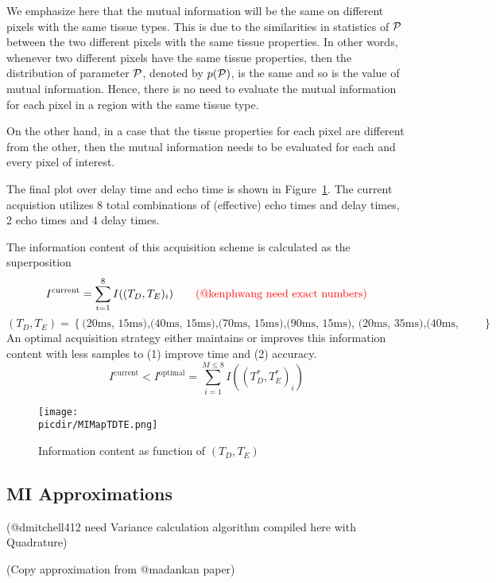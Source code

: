 \documentclass{article}         %
\theoremstyle{definition}
\theoremstyle{remark}
\newcommand{\picdir}{pdffig/}
\begin{document}
We emphasize here that the mutual information will be the same on different pixels with the same tissue types. This is due to the similarities in statistics of $\mathcal{P}$ between the two different pixels with the same tissue properties. In other words, whenever two different pixels have the same tissue properties, then the distribution of parameter $\mathcal{P}$, denoted by $p(\mathcal{P})$, is the same and so is the value of mutual information. Hence, there is no need to evaluate the mutual information for each pixel in a region with the same tissue type. 

On the other hand, in a case that the tissue properties for each pixel are different from the other, then the mutual information needs to be evaluated for each and every pixel of interest.

The final plot over delay time and echo time is shown in Figure~\ref{fig:MIMapTDTE}.
The current acquistion utilizes 8 total combinations of (effective) echo times 
and delay times, 2 echo times and 4 delay times.

The information content of this acquisition scheme is calculated as the superposition
\[
 I^\text{current} = \sum_{i=1}^8 I((T_D, T_E)_i)
\qquad \text{\color{red}(@kenphwang need exact numbers)}
\]
\[
   \left(T_D, T_E\right) = 
   \left\{
   \text{(20ms, 15ms),(40ms, 15ms),(70ms, 15ms),(90ms, 15ms),
         (20ms, 35ms),(40ms, 35ms),(70ms, 35ms),(90ms, 35ms)}
   \right\}
\]
An optimal acquisition strategy either maintains or improves this information content with
less samples to (1) improve time and (2) accuracy.
\[
  I^\text{current} < I^\text{optimal} = \sum_{i=1}^{M \leq 8} I((T^*_D, T^*_E)_i)
\]

\begin{figure}[h] 
\centering
\texttt{[image: \\picdir/MIMapTDTE.png]} 
\caption{ 
Information content as function of $(T_D, T_E)$
}\label{fig:MIMapTDTE}
\end{figure}

\subsection{MI Approximations}

{\color{red}(@dmitchell412 need Variance calculation algorithm compiled here with Quadrature)}

(Copy approximation from @madankan paper)
\end{document}
